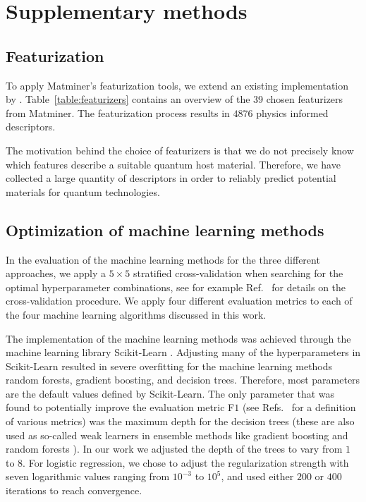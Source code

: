 \documentclass[superscriptaddress,unsortedaddress,
 amsmath,amssymb,
 aps,
]{revtex4-2}
\begin{document}
\newpage 

\section*{Supplementary methods}
\subsection*{Featurization}
To apply Matminer's featurization tools, we extend an existing implementation by \citeauthor{Breuck2021} \cite{Breuck2021}. 
Table~\ref{table:featurizers} contains an overview of the 39  chosen featurizers from Matminer. The featurization process results in $4876$ physics informed descriptors. 

The motivation behind the choice of featurizers is that we do not precisely know which features describe a suitable quantum host material.  Therefore, we have collected a large quantity of descriptors in order to reliably  predict potential materials for quantum technologies. 




\subsection*{Optimization of machine learning methods}

In the evaluation of the machine learning methods for the three different approaches, we apply a $5\times 5$ stratified cross-validation when searching for the optimal hyperparameter combinations, see for example Ref.~\cite{Hastie2009} for details on the cross-validation procedure. We apply four different evaluation metrics to each of the four machine learning algorithms discussed in this work. 

The implementation of the machine learning methods was achieved through the machine learning library Scikit-Learn \cite{Pedregosa2012}. Adjusting many of the hyperparameters in Scikit-Learn resulted in severe overfitting for the machine learning methods random forests, gradient boosting, and decision trees. Therefore, most parameters are the default values defined by Scikit-Learn. The only parameter that was found to potentially improve the evaluation metric F$1$  (see Refs.~\cite{sammut2010,geron2022} for a definition of various metrics) was the maximum depth for the decision trees (these are also used as so-called weak learners in ensemble methods like gradient boosting and random forests \cite{geron2022}). In our work we adjusted 
the depth of the trees to vary from $1$ to $8$. For logistic regression, we chose to adjust the regularization strength with seven logarithmic values ranging from $10^{-3}$ to $10^{5}$, and used either $200$ or $400$ iterations to reach convergence. 
\end{document}
